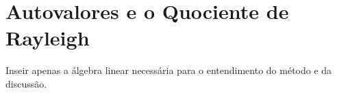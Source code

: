 \chapter{Autovalores e o Quociente de Rayleigh}
\label{cap:algebra}

Inseir apenas a álgebra linear necessária para o entendimento do método e da discussão.